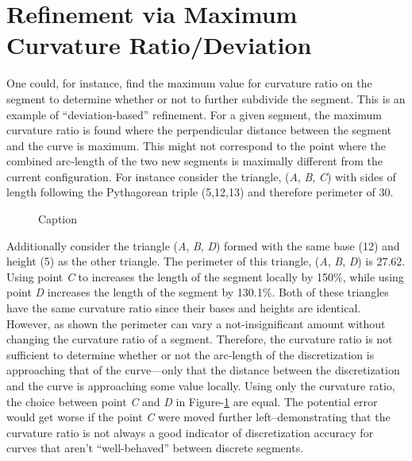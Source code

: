 \section{Refinement via Maximum Curvature Ratio/Deviation}
One could, for instance, find the maximum value for curvature ratio on the segment to determine whether or not to further subdivide the segment.  This is an example of “deviation-based” refinement.  For a given segment, the maximum curvature ratio is found where the perpendicular distance between the segment and the curve is maximum.  This might not correspond to the point where the combined arc-length of the two new segments is maximally different from the current configuration.  For instance consider the triangle, (\textit{A}, \textit{B}, \textit{C}) with sides of length following the Pythagorean triple (5,12,13) and therefore perimeter of 30.

\begin{figure}[h!]
  \caption{\label{CurvatureRatioTriangles} Caption}
\end{figure}

\noindent Additionally consider the triangle (\textit{A}, \textit{B}, 
\textit{D}) formed with the same base (12) and height (5) as the other 
triangle.  The perimeter of this triangle, (\textit{A}, \textit{B}, 
\textit{D}) is 27.62. Using point \textit{C} to increases the length of 
the segment locally by 150\%, while using point \textit{D} increases the 
length of the segment by 130.1\%.  Both of these triangles have the same 
curvature ratio since their bases and heights are identical.  However, as 
shown the perimeter can vary a not-insignificant amount without changing 
the curvature ratio of a segment.  Therefore, the curvature ratio is not 
sufficient to determine whether or not the arc-length of the discretization is approaching that of the curve—only that the distance between the discretization and the curve is approaching some value locally.  Using only the curvature ratio, the choice between point \textit{C} and \textit{D} in Figure-\ref{CurvatureRatioTriangles} are equal.  The potential error would get worse if the point \textit{C} were moved further left--demonstrating that the curvature ratio is not always a good indicator of discretization accuracy for curves that aren’t ``well-behaved'' between discrete segments.


